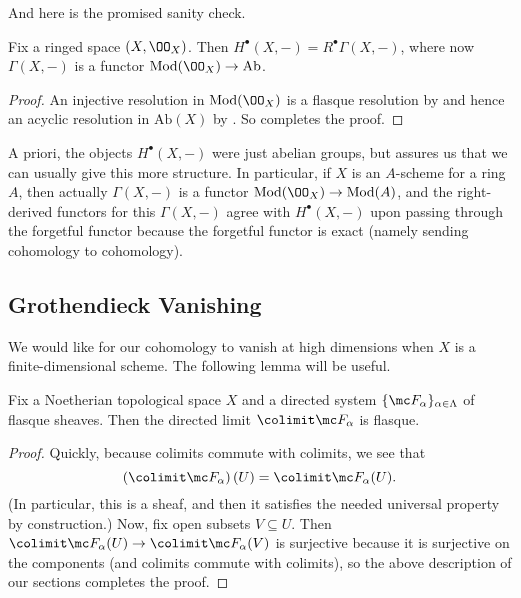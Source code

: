\documentclass[../notes.tex]{subfiles}
\begin{document}
And here is the promised sanity check.
\begin{proposition} \label{prop:ox-cohomology}
	Fix a ringed space $(X,\OO_X)$. Then $H^\bullet(X,-)=R^\bullet\Gamma(X,-)$, where now $\Gamma(X,-)$ is a functor $\mathrm{Mod}(\OO_X)\to\mathrm{Ab}$.
\end{proposition}
\begin{proof}
	An injective resolution in $\mathrm{Mod}(\OO_X)$ is a flasque resolution by  and hence an acyclic resolution in $\mathrm{Ab}(X)$ by . So  completes the proof.
\end{proof}
\begin{remark}
	A priori, the objects $H^\bullet(X,-)$ were just abelian groups, but  assures us that we can usually give this more structure. In particular, if $X$ is an $A$-scheme for a ring $A$, then actually $\Gamma(X,-)$ is a functor $\mathrm{Mod}(\OO_X)\to\mathrm{Mod}(A)$, and the right-derived functors for this $\Gamma(X,-)$ agree with $H^\bullet(X,-)$ upon passing through the forgetful functor because the forgetful functor is exact (namely sending cohomology to cohomology).
\end{remark}

\subsection{Grothendieck Vanishing}
We would like for our cohomology to vanish at high dimensions when $X$ is a finite-dimensional scheme. The following lemma will be useful.
\begin{lemma}
	Fix a Noetherian topological space $X$ and a directed system $\{\mc F_\alpha\}_{\alpha\in\Lambda}$ of flasque sheaves. Then the directed limit $\colimit\mc F_\alpha$ is flasque.
\end{lemma}
\begin{proof}
	Quickly, because colimits commute with colimits, we see that
	\[\left(\colimit\mc F_\alpha\right)(U)=\colimit\mc F_\alpha(U).\]
	(In particular, this is a sheaf, and then it satisfies the needed universal property by construction.) Now, fix open subsets $V\subseteq U$. Then $\colimit\mc F_\alpha(U)\to\colimit\mc F_\alpha(V)$ is surjective because it is surjective on the components (and colimits commute with colimits), so the above description of our sections completes the proof.
\end{proof}
\end{document}
